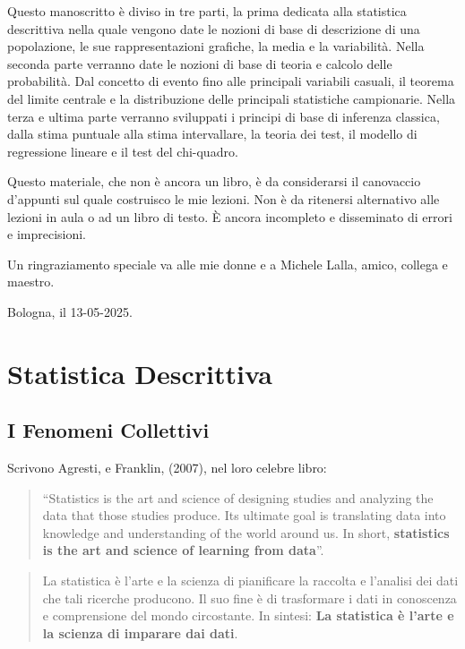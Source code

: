 \documentclass[
  11pt,
]{book}
\theoremstyle{mytheoremstyle}
\theoremstyle{mydefstyle}
\begin{document}
Questo manoscritto è diviso in tre parti, la prima dedicata alla statistica descrittiva nella quale
vengono date le nozioni di base di descrizione di una popolazione, le sue rappresentazioni grafiche,
la media e la variabilità. Nella seconda parte verranno date le nozioni di base di teoria e calcolo delle probabilità.
Dal concetto di evento fino alle principali variabili casuali, il teorema del limite centrale e la distribuzione
delle principali statistiche campionarie. Nella terza e ultima parte verranno sviluppati
i principi di base di inferenza classica, dalla stima puntuale alla stima intervallare, la teoria dei test,
il modello di regressione lineare e il test del chi-quadro.

Questo materiale, che non è ancora un libro, è da considerarsi il canovaccio d'appunti sul quale
costruisco le mie lezioni. Non è da ritenersi alternativo alle lezioni in aula o ad un libro di testo.
È ancora incompleto e disseminato di errori e imprecisioni.

Un ringraziamento speciale va alle mie donne e a Michele Lalla, amico, collega e maestro.

Bologna, il 13-05-2025.

\part{Statistica Descrittiva}

\chapter{I Fenomeni Collettivi}\label{i-fenomeni-collettivi}

Scrivono Agresti, e Franklin, (2007), nel loro celebre libro:

\begin{quote}
``Statistics is the art and science of designing studies and analyzing the data that those studies produce. Its ultimate goal is translating data into knowledge and understanding of the world around us. In short, \textbf{statistics is the art and science of learning from data}''.
\end{quote}

\begin{quote}
La statistica è l'arte e la scienza di pianificare la raccolta e l'analisi dei dati che tali ricerche producono. Il suo fine è di trasformare i dati in conoscenza e comprensione del mondo circostante. In sintesi: \textbf{La statistica è l'arte e la scienza di imparare dai dati}.
\end{quote}
\end{document}
